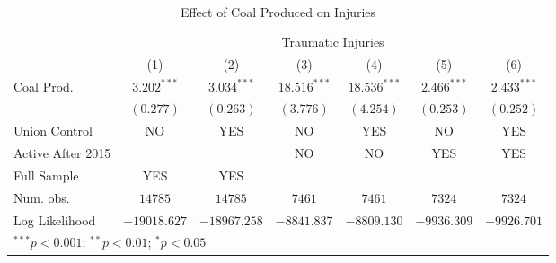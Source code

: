 
\begin{table}[H]
\begin{center}
\begin{tabular}{l c c c c c c}
\hline
 & \multicolumn{6}{c}{Traumatic Injuries} \\
\cline{2-7}
 & (1) & (2) & (3) & (4) & (5) & (6) \\
\hline
Coal Prod.        & $3.202^{***}$ & $3.034^{***}$ & $18.516^{***}$ & $18.536^{***}$ & $2.466^{***}$ & $2.433^{***}$ \\
                  & $(0.277)$     & $(0.263)$     & $(3.776)$      & $(4.254)$      & $(0.253)$     & $(0.252)$     \\
\hline
Union Control     & NO            & YES           & NO             & YES            & NO            & YES           \\
Active After 2015 &               &               & NO             & NO             & YES           & YES           \\
Full Sample       & YES           & YES           &                &                &               &               \\
Num. obs.         & $14785$       & $14785$       & $7461$         & $7461$         & $7324$        & $7324$        \\
Log Likelihood    & $-19018.627$  & $-18967.258$  & $-8841.837$    & $-8809.130$    & $-9936.309$   & $-9926.701$   \\
\hline
\multicolumn{7}{l}{\scriptsize{$^{***}p<0.001$; $^{**}p<0.01$; $^{*}p<0.05$}}
\end{tabular}
\caption{Effect of Coal Produced on Injuries}
\label{irr_traminj_coalprod}
\end{center}
\end{table}

